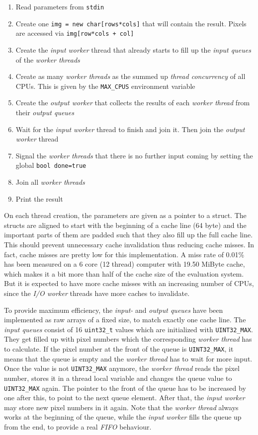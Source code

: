 \begin{enumerate}
    \item Read parameters from \verb$stdin$
    \item Create one \verb$img = new char[rows*cols]$ that will contain the result. Pixels are accessed via \verb$img[row*cols + col]$
    \item Create the \textit{input worker} thread that already starts to fill up the \textit{input queues} of the \textit{worker threads}
    \item Create as many \textit{worker threads} as the summed up \textit{thread concurrency} of all CPUs. This is given by the \verb$MAX_CPUS$ environment variable
    \item Create the \textit{output worker} that collects the results of each \textit{worker thread} from their \textit{output queues}
    \item Wait for the \textit{input worker} thread to finish and join it. Then join the \textit{output worker} thread
    \item Signal the \textit{worker threads} that there is no further input coming by setting the global \verb$bool done=true$
    \item Join all \textit{worker threads}
    \item Print the result
\end{enumerate}

On each thread creation, the parameters are given as a pointer to a struct. The structs are aligned to start with the beginning of a cache line (64 byte) and the important parts of them are padded such that they also fill up the full cache line. This should prevent unnecessary cache invalidation thus reducing cache misses. In fact, cache misses are pretty low for this implementation. A miss rate of 0.01\% has been measured on a 6 core (12 thread) computer with 19.50 MiByte cache, which makes it a bit more than half of the cache size of the evaluation system. But it is expected to have more cache misses with an increasing number of CPUs, since the \textit{I/O worker} threads have more caches to invalidate.

To provide maximum efficiency, the \textit{input-} and \textit{output queues} have been implemented as raw arrays of a fixed size, to match exactly one cache line. The \textit{input queues} consist of 16 \verb$uint32_t$ values which are initialized with \verb$UINT32_MAX$. They get filled up with pixel numbers which the corresponding \textit{worker thread} has to calculate. If the pixel number at the front of the queue is \verb$UINT32_MAX$, it means that the queue is empty and the \textit{worker thread} has to wait for more input. Once the value is not \verb$UINT32_MAX$ anymore, the \textit{worker thread} reads the pixel number, stores it in a thread local variable and changes the queue value to \verb$UINT32_MAX$ again. The pointer to the front of the queue has to be increased by one after this, to point to the next queue element. After that, the \textit{input worker} may store new pixel numbers in it again. Note that the \textit{worker thread} always works at the beginning of the queue, while the \textit{input worker} fills the queue up from the end, to provide a real \textit{FIFO} behaviour.

